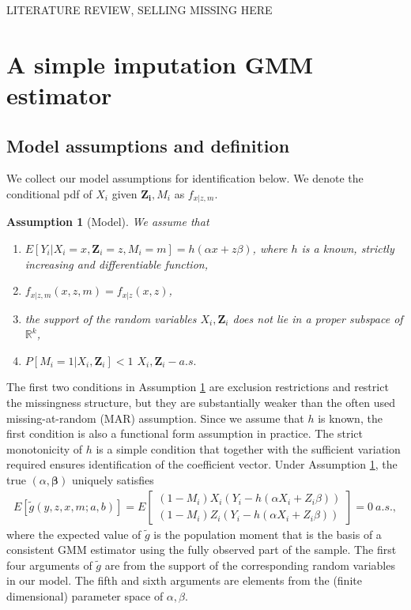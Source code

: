 \documentclass{article}
\newtheorem{assumption}{Assumption}
\theoremstyle{definition}
\theoremstyle{remark}
\begin{document}
{\color{red} LITERATURE REVIEW, SELLING MISSING HERE}

\section{A simple imputation GMM estimator}

\subsection{Model assumptions and definition}
We collect our model assumptions for identification below. We denote the conditional pdf of $X_i$ given $\mathbf{Z_i}, M_i$ as $f_{x|z,m}$.
\begin{assumption}[Model] \label{ass_model}
We assume that
\begin{enumerate}
\item $E[Y_i|X_i=x,\mathbf{Z}_i=z, M_i=m]= h(\alpha x+z\beta)$, where $h$ is a known, strictly increasing and differentiable function,
\item $f_{x|z, m}(x,z,m)= f_{x|z}(x,z)$,
\item the support of the random variables $X_i, \mathbf{Z}_i$ does not lie in a  proper subspace of $\mathbb{R}^k$,
\item $P[M_i=1|X_i,\mathbf{Z}_i]<1$ $X_i,\mathbf{Z}_i-a.s.$
\end{enumerate}
\end{assumption}
The first two conditions in Assumption \ref{ass_model} are exclusion restrictions and restrict the missingness structure, but they are substantially weaker than the often used missing-at-random (MAR) assumption. Since we assume that $h$ is known, the first condition is also a functional form assumption in practice. The strict monotonicity of $h$ is a simple condition that together with the sufficient variation required ensures identification of the coefficient vector. Under Assumption \ref{ass_model}, the true $(\alpha, \mathbf{\beta})$ uniquely satisfies
\begin{align}
E[\tilde{g}(y,z,x,m; a,b)] = E\left[\begin{array}{c}
(1-M_i) X_i(Y_i- h(\alpha X_i+Z_i\beta))  \\
(1-M_i) Z_i(Y_i- h(\alpha X_i+Z_i\beta))
\end{array}\right]=0 \ a.s.,
\end{align}
where the expected value of $\tilde{g}$ is the population moment that is the basis of a consistent GMM estimator using the fully observed part of the sample. The first four arguments of $\tilde{g}$ are from the support of the corresponding random variables in our model. The fifth and sixth arguments are elements from  the (finite dimensional) parameter space of $\alpha, \beta$.
\end{document}
